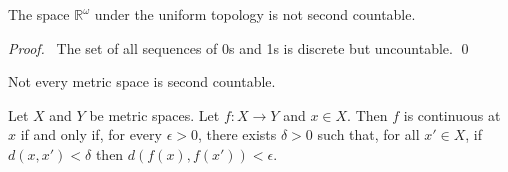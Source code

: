  \begin{prop}
 The space $\mathbb{R}^\omega$ under the uniform topology is not second
countable.
\end{prop}

\begin{proof}
 \pf\ The set of all sequences of 0s and 1s is discrete but uncountable. \qed
\end{proof}

\begin{cor}
Not every metric space is second countable.
\end{cor}

\begin{thm}
  \label{thm:topology:metric:continuous}
  Let $X$ and $Y$ be metric spaces. Let $f : X \rightarrow Y$ and $x \in X$.
  Then $f$ is continuous at $x$ if and only if, for every $\epsilon > 0$,
  there
  exists $\delta > 0$ such that, for all $x' \in X$, if $d(x, x') < \delta$
  then
  $d(f(x), f(x')) < \epsilon$.
\end{thm}

